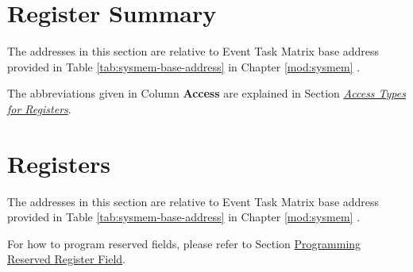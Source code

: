 \documentclass[main\_\_EN.tex]{subfiles}
\begin{document}
\newpage
\hypertarget{evntaskmatrix-reg-summ}{}
\section{Register Summary}
\label{sec:evntaskmatrix-reg-summ}

The addresses in this section are relative to Event Task Matrix base address provided in Table \ref{tab:sysmem-base-address} in Chapter \ref{mod:sysmem} \textit{}.

The abbreviations given in Column \textbf{Access} are explained in Section \hyperref[glossary-access-types]{\textit{Access Types for Registers}}.






\newpage
\section{Registers}

The addresses in this section are relative to Event Task Matrix base address provided in Table \ref{tab:sysmem-base-address} in Chapter \ref{mod:sysmem} \textit{}.

For how to program reserved fields, please refer to Section \hyperref[programming-reserved-field]{Programming Reserved Register Field}.


\end{document}

